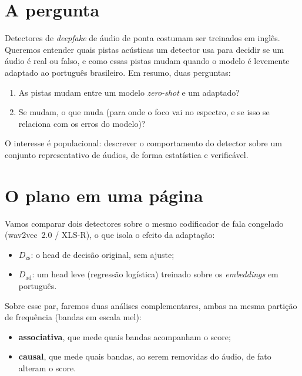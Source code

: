 \documentclass[11pt,a4paper]{article}
\begin{document}
\section{A pergunta}

Detectores de \emph{deepfake} de áudio de ponta costumam ser treinados em inglês.
Queremos entender quais pistas acústicas um detector usa para decidir se um áudio
é real ou falso, e como essas pistas mudam quando o modelo é levemente adaptado ao
português brasileiro. Em resumo, duas perguntas:

\begin{enumerate}[label=\textbf{Q\arabic*.}]
  \item As pistas mudam entre um modelo \emph{zero-shot} e um adaptado?
  \item Se mudam, o que muda (para onde o foco vai no espectro, e se isso se
        relaciona com os erros do modelo)?
\end{enumerate}

O interesse é populacional: descrever o comportamento do detector sobre um
conjunto representativo de áudios, de forma estatística e verificável.

\section{O plano em uma página}

Vamos comparar dois detectores sobre o mesmo codificador de fala congelado
(wav2vec~2.0 / XLS-R), o que isola o efeito da adaptação:

\begin{itemize}[nosep]
  \item $D_{\mathrm{zs}}$: o head de decisão original, sem ajuste;
  \item $D_{\mathrm{ad}}$: um head leve (regressão logística) treinado sobre os
        \emph{embeddings} em português.
\end{itemize}

Sobre esse par, faremos duas análises complementares, ambas na mesma partição de
frequência (bandas em escala mel):

\begin{itemize}[nosep]
  \item \textbf{associativa}, que mede quais bandas acompanham o score;
  \item \textbf{causal}, que mede quais bandas, ao serem removidas do áudio, de
        fato alteram o score.
\end{itemize}
\end{document}
